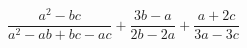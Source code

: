 \begin{ex}[type=expression]
	\begin{condition}
		\( \dfrac{a^2-bc}{a^2-ab+bc-ac}+\dfrac{3b-a}{2b-2a}+\dfrac{a+2c}{3a-3c} \)
	\end{condition}
\end{ex}